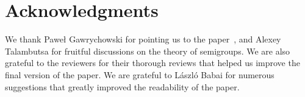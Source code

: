 %
%
%
%
%
%
%
%
%
%
%
%
%
%
%
%
%
%
%
%
%
%
%
%
%
%
%
%
%
%
%
%
%
%
%
%
%
%
%
%
%
%
%
%
%
%
%
%
%
%
%
%
%
%
%
%
%
%
%
%
%
%
%
%
%
%
%
%
%
%
%
%
%
%
%
%
%
%
%
%
%
%
%
%
%
%
%
%
%
%
%
%
%
%
%
%
%


\section*{Acknowledgments}
We thank
%
%
Pawe\l{} Gawrychowski
for pointing us to the
paper~\cite{DBLP:journals/ijcga/ChazelleR91}, and Alexey Talambutsa for
fruitful discussions on the theory of semigroups.
We are also grateful to the reviewers for their thorough reviews that helped us
improve the final version of the paper.
We are grateful to László Babai for numerous suggestions that greatly improved the
readability of the paper.
